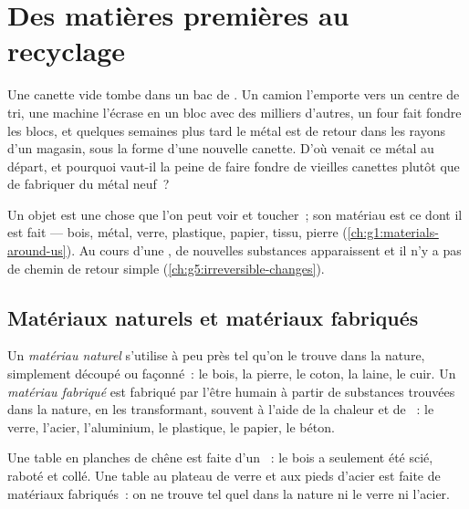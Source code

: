 \chapter{Des matières premières au recyclage}\label{ch:g5:raw-materials-and-recycling}

Une canette vide tombe dans un bac de . Un camion l'emporte
vers un centre de tri, une machine l'écrase en un bloc avec des milliers
d'autres, un four fait fondre les blocs, et quelques semaines plus tard
le métal est de retour dans les rayons d'un magasin, sous la forme d'une
nouvelle canette. D'où venait ce métal au départ, et pourquoi vaut-il la
peine de faire fondre de vieilles canettes plutôt que de fabriquer du
métal neuf~?

\begin{recall}
Un objet est une chose que l'on peut voir et toucher~; son matériau est
ce dont il est fait --- bois, métal, verre, plastique, papier, tissu,
pierre (\cref{ch:g1:materials-around-us}). Au cours d'une , de nouvelles substances apparaissent et il n'y a pas de chemin
de retour simple (\cref{ch:g5:irreversible-changes}).
\end{recall}

\section{Matériaux naturels et matériaux fabriqués}

\begin{definition}\label{def:g5:raw-materials-and-recycling:natural-material}
Un \emph{matériau naturel} s'utilise à peu près
tel qu'on le trouve dans la nature, simplement découpé ou façonné~: le
bois, la pierre, le coton, la laine, le cuir. Un
\emph{matériau fabriqué} est fabriqué par
l'être humain à partir de substances trouvées dans la nature, en les
transformant, souvent à l'aide de la chaleur et de ~: le verre, l'acier, l'aluminium, le plastique, le papier, le
béton.
\end{definition}

\begin{example}\label{ex:g5:raw-materials-and-recycling:tables}
Une table en planches de chêne est faite d'un ~: le bois
a seulement été scié, raboté et collé. Une table au plateau de verre et
aux pieds d'acier est faite de matériaux fabriqués~: on ne trouve tel
quel dans la nature ni le verre ni l'acier.
\end{example}


